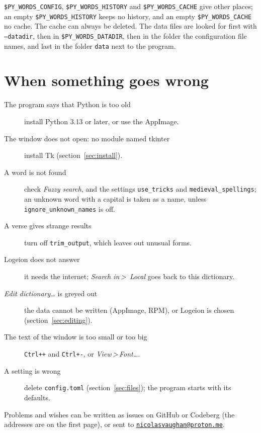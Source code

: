 \documentclass[12pt,
              article,
              oneside
              ]{memoir}
\newcommand*{\menu}[1]{\textit{#1}}
\newcommand*{\then}{\,>\,}
\newcommand*{\key}[1]{\texttt{#1}}
\begin{document}
\noindent{}%
\texttt{\$PY\_WORDS\_CONFIG}, \texttt{\$PY\_WORDS\_HISTORY} and
\texttt{\$PY\_WORDS\_CACHE} give other places; an empty
\texttt{\$PY\_WORDS\_HISTORY} keeps no history, and an empty
\texttt{\$PY\_WORDS\_CACHE} no cache. The cache can always be deleted.
The data files are looked for first with \texttt{--datadir}, then in
\texttt{\$PY\_WORDS\_DATADIR}, then in the folder the configuration file
names, and last in the folder \texttt{data} next to the program.

\section{When something goes wrong}

%
\begin{description}
\item[The program says that Python is too old] install Python 3.13 or
  later, or use the AppImage.
\item[The window does not open: no module named tkinter] install Tk
  (section~\ref{sec:install}).
\item[A word is not found] check \menu{Fuzzy search}, and the settings
  \texttt{use\_tricks} and \texttt{medieval\_spellings}; an unknown word
  with a capital is taken as a name, unless
  \texttt{ignore\_unknown\_names} is off.
\item[A verse gives strange results] turn off \texttt{trim\_output}, which
  leaves out unusual forms.
\item[Logeion does not answer] it needs the internet; \menu{Search in\then
  Local} goes back to this dictionary.
\item[\menu{Edit dictionary\ldots} is greyed out] the data cannot be
  written (AppImage, RPM), or Logeion is chosen
  (section~\ref{sec:editing}).
\item[The text of the window is too small or too big] \key{Ctrl++} and
  \key{Ctrl+-}, or \menu{View\then Font\ldots}.
\item[A setting is wrong] delete \texttt{config.toml}
  (section~\ref{sec:files}); the program starts with its defaults.
\end{description}

\noindent
Problems and wishes can be written as issues on GitHub or Codeberg (the
addresses are on the first page), or sent to
\href{mailto:nicolasvaughan@proton.me}{\texttt{nicolasvaughan@proton.me}}.

\printindex
\end{document}
